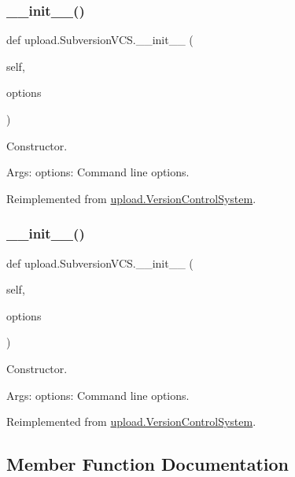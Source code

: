 \subsubsection{\texorpdfstring{\_\_init\_\_()}{\_\_init\_\_()}\hspace{0.1cm}{\footnotesize\ttfamily [1/2]}}
{\footnotesize\ttfamily def upload.\+Subversion\+V\+C\+S.\+\_\+\+\_\+init\+\_\+\+\_\+ (\begin{DoxyParamCaption}\item[{}]{self,  }\item[{}]{options }\end{DoxyParamCaption})}

\begin{DoxyVerb}Constructor.

Args:
  options: Command line options.
\end{DoxyVerb}
 

Reimplemented from \mbox{\hyperlink{classupload_1_1_version_control_system_ace97e5785a2b40011404ae6fbb956ecf}{upload.\+Version\+Control\+System}}.

\mbox{\label{classupload_1_1_subversion_v_c_s_a8333f94e27335ce83eed0cc3f5a1eeb0}} 
\subsubsection{\texorpdfstring{\_\_init\_\_()}{\_\_init\_\_()}\hspace{0.1cm}{\footnotesize\ttfamily [2/2]}}
{\footnotesize\ttfamily def upload.\+Subversion\+V\+C\+S.\+\_\+\+\_\+init\+\_\+\+\_\+ (\begin{DoxyParamCaption}\item[{}]{self,  }\item[{}]{options }\end{DoxyParamCaption})}

\begin{DoxyVerb}Constructor.

Args:
  options: Command line options.
\end{DoxyVerb}
 

Reimplemented from \mbox{\hyperlink{classupload_1_1_version_control_system_ace97e5785a2b40011404ae6fbb956ecf}{upload.\+Version\+Control\+System}}.



\subsection{Member Function Documentation}
\mbox{\label{classupload_1_1_subversion_v_c_s_ab484ddd61e217927fb61639bacdbb68d}} 
